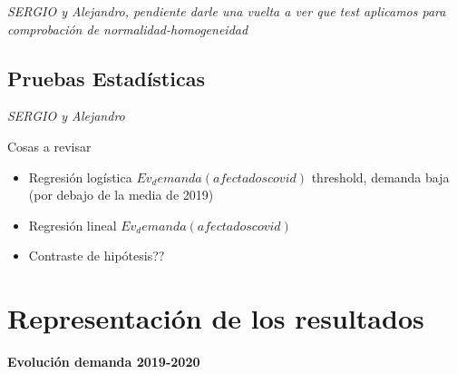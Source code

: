 \documentclass[
]{article}
\newenvironment{Shaded}{\begin{snugshade}}{\end{snugshade}}
\newcommand{\DataTypeTok}[1]{\textcolor[rgb]{0.87,0.87,0.75}{#1}}
\newcommand{\DecValTok}[1]{\textcolor[rgb]{0.86,0.86,0.80}{#1}}
\newcommand{\KeywordTok}[1]{\textcolor[rgb]{0.94,0.87,0.69}{#1}}
\newcommand{\NormalTok}[1]{\textcolor[rgb]{0.80,0.80,0.80}{#1}}
\newcommand{\OperatorTok}[1]{\textcolor[rgb]{0.94,0.94,0.82}{#1}}
\newcommand{\StringTok}[1]{\textcolor[rgb]{0.80,0.58,0.58}{#1}}
\begin{document}
{ \emph{SERGIO y Alejandro, pendiente darle una vuelta a ver que test
aplicamos para comprobación de normalidad-homogeneidad}}

\hypertarget{pruebas-estaduxedsticas}{%
\subsection{Pruebas Estadísticas}\label{pruebas-estaduxedsticas}}

{ \emph{SERGIO y Alejandro}}

Cosas a revisar

\begin{itemize}
\item
  Regresión logística \(Ev_demanda(afectados covid)\) threshold, demanda
  baja (por debajo de la media de 2019)
\item
  Regresión lineal \(Ev_demanda(afectados covid)\)
\item
  Contraste de hipótesis??
\end{itemize}

\hypertarget{representaciuxf3n-de-los-resultados}{%
\section{Representación de los
resultados}\label{representaciuxf3n-de-los-resultados}}

\textbf{Evolución demanda 2019-2020}

\begin{Shaded}
\end{Shaded}
\end{document}
